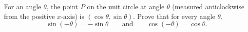For an angle $\theta$, the point $P$ on the unit circle at angle $\theta$ (measured anticlockwise from the positive $x$-axis) is $(\cos\theta,\sin\theta)$. Prove that for every angle $\theta$,
\[\sin(-\theta)=-\sin\theta\qquad\text{and}\qquad\cos(-\theta)=\cos\theta.\]
